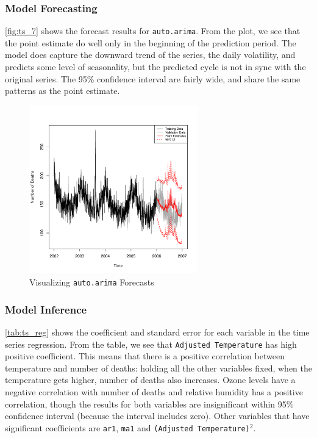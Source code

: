 \documentclass{article}\usepackage[]{graphicx}\usepackage[]{color}
\newenvironment{knitrout}{}{} %
\begin{document}
\subsubsection*{Model Forecasting}

\autoref{fig:ts_7} shows the forecast results for \texttt{auto.arima}. From the plot, we see that the point estimate do well only in the beginning of the prediction period. The model does capture the downward trend of the series, the daily volatility, and predicts some level of seasonality, but the predicted cycle is not in sync with the original series. The 95\% confidence interval are fairly wide, and share the same patterns as the point estimate. 

\begin{knitrout}
\color{fgcolor}\begin{figure}[H]

{\centering \includegraphics[width=0.65\textwidth]{figure/ts_7-1} 

}

\caption{Visualizing \texttt{auto.arima} Forecasts}\label{fig:ts_7}
\end{figure}


\end{knitrout}

\subsubsection*{Model Inference}

\autoref{tab:ts_reg} shows the coefficient and standard error for each variable in the time series regression. From the table, we see that \texttt{Adjusted Temperature} has high positive coefficient. This means that there is a positive correlation between temperature and number of deaths: holding all the other variables fixed, when the temperature gets higher, number of deaths also increases. Ozone levels have a negative correlation with number of deaths and relative humidity has a positive correlation, though the results for both variables are insignificant within 95\% confidence interval (because the interval includes zero). Other variables that have significant coefficients are \texttt{ar1}, \texttt{ma1} and \texttt{(Adjusted Temperature)$^2$}.
\end{document}
